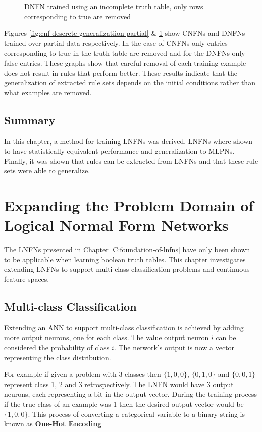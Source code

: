 \begin{figure}[H]
\begin{minipage}[b]{0.45\textwidth}
		\caption{DNFN trained using an incomplete truth table, only rows corresponding to true are removed}
		\label{fig:dnf-descrete-generalizatiion-partial}
	\end{minipage}
	\hfill
\end{figure}

Figures \ref{fig:cnf-descrete-generalizatiion-partial} \& \ref{fig:dnf-descrete-generalizatiion-partial} show CNFNs and DNFNs trained over partial data respectively. In the case of CNFNs only entries corresponding to true in the truth table are removed and for the DNFNs only false entries. These graphs show that careful removal of each training example does not result in rules that perform better. These results indicate that the generalization of extracted rule sets depends on the initial conditions rather than what examples are removed.

\section{Summary}
In this chapter, a method for training LNFNs was derived. LNFNs where shown to have statistically equivalent performance and generalization to MLPNs. Finally, it was shown that rules can be extracted from LNFNs and that these rule sets were able to generalize.

\chapter{Expanding the Problem Domain of Logical Normal Form Networks} \label{C:investigation-of-lnfns}
The LNFNs presented in Chapter \ref{C:foundation-of-lnfns} have only been shown to be applicable when learning boolean truth tables. This chapter investigates extending LNFNs to support multi-class classification problems and continuous feature spaces.

\section{Multi-class Classification}
Extending an ANN to support multi-class classification is achieved by adding more output neurons, one for each class. The value output neuron $i$ can be considered the probability of class $i$. The network's output is now a vector representing the class distribution. 

For example if given a problem with 3 classes then $\{1,0,0\}$, $\{0,1,0\}$ and $\{0,0,1\}$ represent class 1, 2 and 3 retrospectively. The LNFN would have 3 output neurons, each representing a bit in the output vector. During the training process if the true class of an example was 1 then the desired output vector would be $\{1,0,0\}$. This process of converting a categorical variable to a binary string is known as \textbf{One-Hot Encoding}

